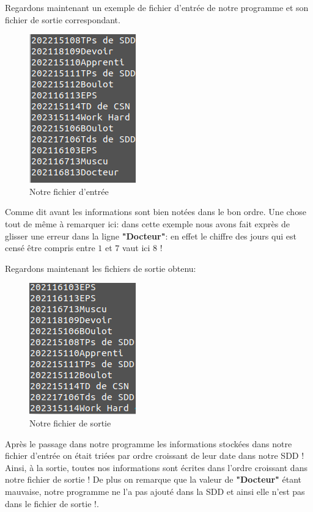 \documentclass[12pt,french]{article} %
\begin{document}
Regardons maintenant un exemple de fichier d'entrée de notre programme et son fichier de sortie correspondant.\newline

\begin{figure}[H]
	\includegraphics[scale=0.6]{entree.png}
	\centering
	\caption{Notre fichier d'entrée}
\end{figure}

Comme dit avant les informations sont bien notées dans le bon ordre. Une chose tout de même à remarquer ici: dans cette exemple nous avons fait exprès de glisser une erreur dans la ligne \textbf{"Docteur"}: en effet le chiffre des jours qui est censé être compris entre $1$ et $7$ vaut ici $8$ ! 

Regardons maintenant les fichiers de sortie obtenu:

\begin{figure}[H]
	\includegraphics[scale=0.6]{sortie.png}
	\centering
	\caption{Notre fichier de sortie}
\end{figure}

Après le passage dans notre programme les informations stockées dans notre fichier d'entrée on était triées par ordre croissant de leur date dans notre SDD ! Ainsi, à la sortie, toutes nos informations sont écrites dans l'ordre croissant dans notre fichier de sortie ! De plus on remarque que la valeur de \textbf{"Docteur"} étant mauvaise, notre programme ne l'a pas ajouté dans la SDD et ainsi elle n'est pas dans le fichier de sortie !.
\end{document}
